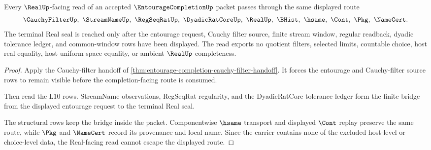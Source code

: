 \begin{theorem}
\label{thm:entourage-completion-real-route-nonescape}
Every $\RealUp$-facing read of an accepted $\EntourageCompletionUp$ packet
passes through the same displayed route
$$
\CauchyFilterUp,\ \StreamNameUp,\ \RegSeqRatUp,\ \DyadicRatCoreUp,\ \RealUp,
\ \BHist,\ \hsame,\ \Cont,\ \Pkg,\ \NameCert .
$$
The terminal Real seal is reached only after the entourage request, Cauchy
filter source, finite stream window, regular readback, dyadic tolerance ledger,
and common-window rows have been displayed. The read exports no quotient
filters, selected limits, countable choice, host real equality, host uniform
space equality, or ambient $\RealUp$ completeness.
\end{theorem}
\begin{proof}
Apply the Cauchy-filter handoff of
\autoref{thm:entourage-completion-cauchy-filter-handoff}. It forces the
entourage and Cauchy-filter source rows to remain visible before the
completion-facing route is consumed.

Then read the L10 rows. StreamName observations, RegSeqRat regularity, and the
DyadicRatCore tolerance ledger form the finite bridge from the displayed
entourage request to the terminal Real seal.

The structural rows keep the bridge inside the packet. Componentwise $\hsame$
transport and displayed $\Cont$ replay preserve the same route, while $\Pkg$
and $\NameCert$ record its provenance and local name. Since the carrier
contains none of the excluded host-level or choice-level data, the Real-facing
read cannot escape the displayed route.
\end{proof}




